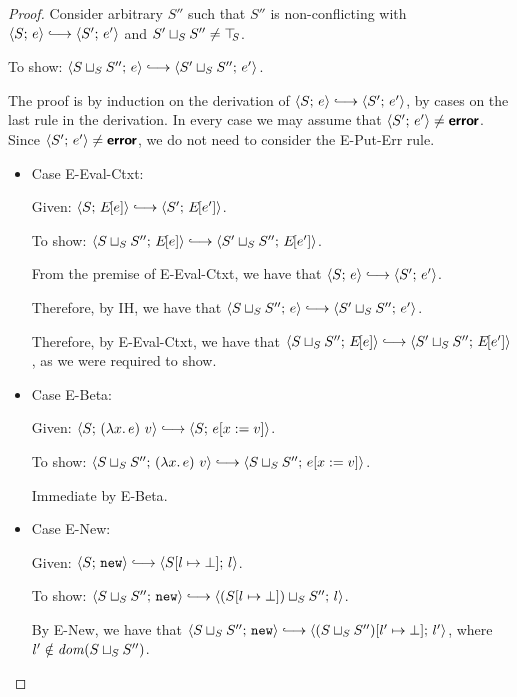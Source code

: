 \begin{proof}
  Consider arbitrary $S''$ such that $S''$ is non-conflicting with
  $\config{S}{e} \parstepsto \config{S'}{e'}$ and $S' \sqcup_{S} S''
  \neq \top\hspace{-0.85mm}_{S}$.

  To show: $\config{\lubstore{S}{S''}}{e} \parstepsto
  \config{\lubstore{S'}{S''}}{e'}$.

  The proof is by induction on the derivation of $\config{S}{e}
  \parstepsto \config{S'}{e'}$, by cases on the last rule in the
  derivation.  In every case we may assume that $\langle S';\, e' \rangle \neq
  \textbf{\textsf{error}}$.  Since $\langle S';\, e' \rangle \neq \textbf{\textsf{error}}$, we do not need to
  consider the {\sc E-Put-Err} rule.
  \begin{itemize}

    \item Case {\sc E-Eval-Ctxt}:

      Given: $\config{S}{\E{e}} \parstepsto \config{S'}{\E{e'}}$.

      To show: $\config{\lubstore{S}{S''}}{\E{e}} \parstepsto
      \config{\lubstore{S'}{S''}}{\E{e'}}$.

      From the premise of {\sc E-Eval-Ctxt}, we have that
      $\config{S}{e} \parstepsto \config{S'}{e'}$.

      Therefore, by IH, we have that $\config{\lubstore{S}{S''}}{e}
      \parstepsto \config{\lubstore{S'}{S''}}{e'}$.

      Therefore, by {\sc E-Eval-Ctxt}, we have that
      $\config{\lubstore{S}{S''}}{\E{e}} \parstepsto
      \config{\lubstore{S'}{S''}}{\E{e'}}$, as we were required to
      show.

    \item Case {\sc E-Beta}:

      Given: $\config{S}{\app{(\lam{x}{e})}{v}} \parstepsto
      \config{S}{\subst{e}{x}{v}}$.

      To show: $\config{\lubstore{S}{S''}}{\app{(\lam{x}{e})}{v}}
      \parstepsto \config{\lubstore{S}{S''}}{\subst{e}{x}{v}}$.

      Immediate by {\sc E-Beta}.

    \item Case {\sc E-New}:

      Given: $\config{S}{\NEW} \parstepsto
      \config{\extSRaw{S}{l}{\bot}}{l}$.

      To show: $\config{\lubstore{S}{S''}}{\NEW} \parstepsto
      \config{\lubstore{(\extSRaw{S}{l}{\bot})}{S''}}{l}$.

      By {\sc E-New}, we have that $\config{\lubstore{S}{S''}}{\NEW}
      \parstepsto \config{\extSRaw{(\lubstore{S}{S''})}{l'}{\bot}}{l'}$,
      where $l' \notin \mathit{dom}(S \sqcup_{S} S'')$.


\end{itemize}
\end{proof}
